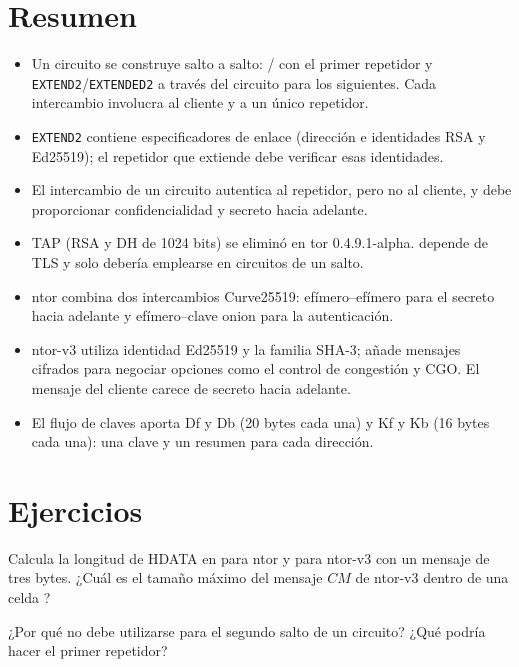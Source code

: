 \section*{Resumen}
\begin{itemize}
  \item Un circuito se construye salto a salto: / con el primer repetidor y \texttt{EXTEND2}/\texttt{EXTENDED2} a través del circuito para los siguientes. Cada intercambio involucra al cliente y a un único repetidor.
  \item \texttt{EXTEND2} contiene especificadores de enlace (dirección e identidades RSA y Ed25519); el repetidor que extiende debe verificar esas identidades.
  \item El intercambio de un circuito autentica al repetidor, pero no al cliente, y debe proporcionar confidencialidad y secreto hacia adelante.
  \item TAP (RSA y DH de 1024 bits) se eliminó en tor 0.4.9.1-alpha.  depende de TLS y solo debería emplearse en circuitos de un salto.
  \item ntor combina dos intercambios Curve25519: efímero--efímero para el secreto hacia adelante y efímero--clave onion para la autenticación.
  \item ntor-v3 utiliza identidad Ed25519 y la familia SHA-3; añade mensajes cifrados para negociar opciones como el control de congestión y CGO. El mensaje del cliente carece de secreto hacia adelante.
  \item El flujo de claves aporta Df y Db (20 bytes cada una) y Kf y Kb (16 bytes cada una): una clave y un resumen para cada dirección.
\end{itemize}

\section*{Ejercicios}

\begin{esercizio}[1]\label{es:09-dimensioni}
Calcula la longitud de HDATA en  para ntor y para ntor-v3 con un mensaje de tres bytes. ¿Cuál es el tamaño máximo del mensaje $CM$ de ntor-v3 dentro de una celda ?
\end{esercizio}

\begin{esercizio}[1]\label{es:09-fast}
¿Por qué no debe utilizarse  para el segundo salto de un circuito? ¿Qué podría hacer el primer repetidor?
\end{esercizio}

